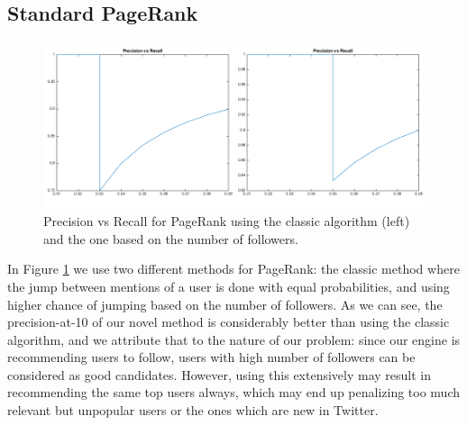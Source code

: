 \subsection{Standard PageRank}

\begin{figure}[H]
\centering
\includegraphics[width=5.5in,natwidth=966,natheight=420]{images/exptopr.png}
\caption{Precision vs Recall for PageRank using the classic algorithm (left) and the one based on the number of followers.}
\label{fig:exptopr}
\end{figure}

In Figure \ref{fig:exptopr} we use two different methods for PageRank: the
classic method where the jump between mentions of a user is done with equal
probabilities, and using higher chance of jumping based on the number of
followers. As we can see, the precision-at-10 of our novel method is
considerably better than using the classic algorithm, and we attribute that to
the nature of our problem: since our engine is recommending users to follow,
users with high number of followers can be considered as good candidates.
However, using this extensively may result in recommending the same top users
always, which may end up penalizing too much relevant but unpopular users or the
ones which are new in Twitter.
